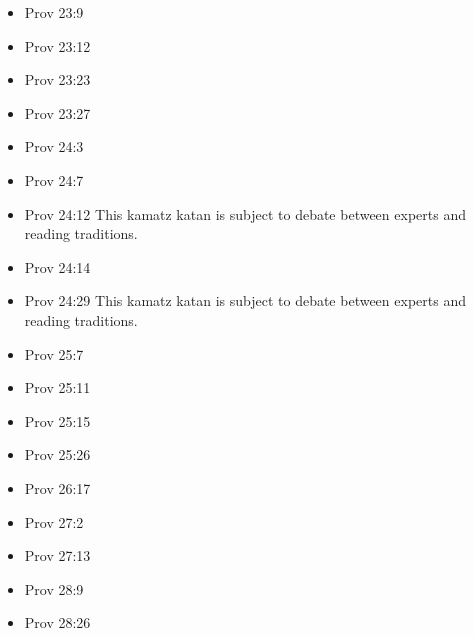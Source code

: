\documentclass[14pt]{article}
\begin{document}
\begin{multicols}{2}
\begin{itemize}
									\item Prov 23:9
									
									\item Prov 23:12
									
									\item Prov 23:23
									
									\item Prov 23:27
									
									\item Prov 24:3
									
									\item Prov 24:7
									
									\item Prov 24:12 This kamatz katan is subject to debate between experts and reading traditions.
									
									\item Prov 24:14
									
									\item Prov 24:29 This kamatz katan is subject to debate between experts and reading traditions.
									
									\item Prov 25:7
									
									\item Prov 25:11
									
									\item Prov 25:15
									
									\item Prov 25:26
									
									\item Prov 26:17
									
									\item Prov 27:2
									
									\item Prov 27:13
									
									\item Prov 28:9
									
									\item Prov 28:26
									

\end{itemize}
\end{multicols}
\end{document}
